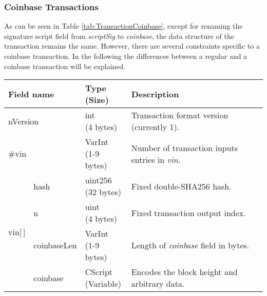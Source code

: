 \subsubsection{Coinbase Transactions} \label{sec:CoinbaseTransactions}
As can be seen in Table \ref{tab:TransactionCoinbase}, except for renaming the signature script field from \textit{scriptSig} to \textit{coinbase}, the data structure of the transaction remains the same. However, there are several constraints specific to a coinbase transaction. In the following the differences between a regular and a coinbase transaction will be explained.
\begin{table}[ht!]

	\centering
	\begin{tabular}{ | m{25pt} | m{70pt} | >{\centering} m{60pt} | m{200pt} | }
	
		\hline
		\multicolumn{2}{|l|}{\textbf{Field name}} &
		\bigcell{c}{\textbf{Type} \\ \textbf{(Size)}} &
		\textbf{Description}\\ \hline\hline
    	
    	\multicolumn{2}{|l|}{nVersion} &
    	\bigcell{c}{int \\ (4 bytes)} &
    	Transaction format version (currently 1).\\ \hline
    	
	    \multicolumn{2}{|l|}{\#vin} &
	    \bigcell{c}{VarInt \\ (1-9 bytes)} &
    	Number of transaction inputs entries in \textit{vin}. \\ \hline
    	
		\multirow{9}{25pt}{\centering vin[\,]} &
		
		hash &
		\bigcell{c}{uint256 \\ (32 bytes)} &
		Fixed double-SHA256 hash.\\ \cline{2-4}
		
		& n &
		\bigcell{c}{uint \\ (4 bytes)} &
		Fixed transaction output index. \\ \cline{2-4}

		& coinbaseLen &
		\bigcell{c}{VarInt \\ (1-9 bytes)} &
		Length of \textit{coinbase} field in bytes. \\ \cline{2-4}
				
		& coinbase &
		\bigcell{c}{CScript \\ (Variable)} &
		Encodes the block height and arbitrary data. \\ \cline{2-4}
		

\end{tabular}
\end{table}
